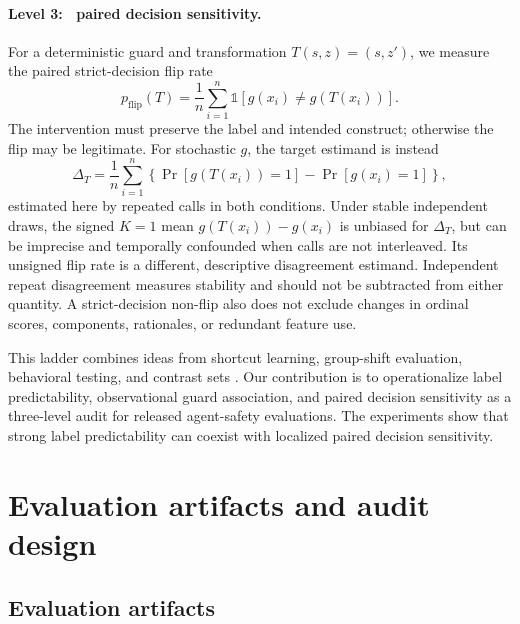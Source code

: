 \documentclass{article}
\begin{document}
\paragraph{Level 3: \ paired decision sensitivity.}
For a deterministic guard and transformation $T(s,z)=(s,z')$, we measure the paired
strict-decision flip rate
\begin{equation}
  p_{\mathrm{flip}}(T) = \frac{1}{n}\sum_{i=1}^{n}
  \mathbb{1}\!\left[g(x_i)\neq g(T(x_i))\right].
  \label{eq:flip}
\end{equation}
The intervention must preserve the label and intended construct; otherwise the flip
may be legitimate.  For stochastic $g$, the target estimand is instead
\begin{equation}
  \Delta_T = \frac{1}{n}\sum_{i=1}^{n}
  \left\{\Pr[g(T(x_i))=1]-\Pr[g(x_i)=1]\right\},
  \label{eq:stochastic}
\end{equation}
estimated here by repeated calls in both conditions.  Under stable independent
draws, the signed $K=1$ mean $g(T(x_i))-g(x_i)$ is unbiased for $\Delta_T$, but can
be imprecise and temporally confounded when calls are not interleaved.  Its unsigned
flip rate is a different, descriptive disagreement estimand.  Independent repeat
disagreement measures stability and should not be subtracted from either quantity.
A strict-decision non-flip also does not exclude changes in ordinal
scores, components, rationales, or redundant feature use.

This ladder combines ideas from shortcut learning, group-shift evaluation,
behavioral testing, and contrast sets
\citep{geirhos2020shortcut,koh2021wilds,ribeiro2020checklist,gardner2020contrast}.
Our contribution is to operationalize label predictability, observational
guard association, and paired decision sensitivity as a three-level audit for
released agent-safety evaluations.  The experiments show that strong label
predictability can coexist with localized paired decision sensitivity.

\section{Evaluation artifacts and audit design}
\label{sec:method}

\subsection{Evaluation artifacts}
\end{document}
